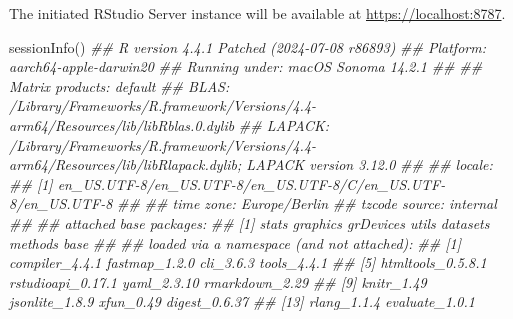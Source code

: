 \documentclass[
  letterpaper,
  DIV=11,
  numbers=noendperiod]{scrreprt}
\newenvironment{Shaded}{\begin{snugshade}}{\end{snugshade}}
\newcommand{\DocumentationTok}[1]{\textcolor[rgb]{0.37,0.37,0.37}{\textit{#1}}}
\newcommand{\FunctionTok}[1]{\textcolor[rgb]{0.28,0.35,0.67}{#1}}
\newcommand{\NormalTok}[1]{\textcolor[rgb]{0.00,0.23,0.31}{#1}}
\begin{document}
The initiated RStudio Server instance will be available at
\url{https://localhost:8787}.

\begin{tcolorbox}[enhanced jigsaw, toprule=.15mm, title=\textcolor{quarto-callout-note-color}{\faInfo}\hspace{0.5em}{Session info}, breakable, coltitle=black, colback=white, colframe=quarto-callout-note-color-frame, left=2mm, opacityback=0, colbacktitle=quarto-callout-note-color!10!white, opacitybacktitle=0.6, rightrule=.15mm, toptitle=1mm, arc=.35mm, bottomtitle=1mm, titlerule=0mm, bottomrule=.15mm, leftrule=.75mm]

\begin{Shaded}
\begin{Highlighting}[]
\FunctionTok{sessionInfo}\NormalTok{()}
\DocumentationTok{\#\#  R version 4.4.1 Patched (2024{-}07{-}08 r86893)}
\DocumentationTok{\#\#  Platform: aarch64{-}apple{-}darwin20}
\DocumentationTok{\#\#  Running under: macOS Sonoma 14.2.1}
\DocumentationTok{\#\#  }
\DocumentationTok{\#\#  Matrix products: default}
\DocumentationTok{\#\#  BLAS:   /Library/Frameworks/R.framework/Versions/4.4{-}arm64/Resources/lib/libRblas.0.dylib }
\DocumentationTok{\#\#  LAPACK: /Library/Frameworks/R.framework/Versions/4.4{-}arm64/Resources/lib/libRlapack.dylib;  LAPACK version 3.12.0}
\DocumentationTok{\#\#  }
\DocumentationTok{\#\#  locale:}
\DocumentationTok{\#\#  [1] en\_US.UTF{-}8/en\_US.UTF{-}8/en\_US.UTF{-}8/C/en\_US.UTF{-}8/en\_US.UTF{-}8}
\DocumentationTok{\#\#  }
\DocumentationTok{\#\#  time zone: Europe/Berlin}
\DocumentationTok{\#\#  tzcode source: internal}
\DocumentationTok{\#\#  }
\DocumentationTok{\#\#  attached base packages:}
\DocumentationTok{\#\#  [1] stats     graphics  grDevices utils     datasets  methods   base     }
\DocumentationTok{\#\#  }
\DocumentationTok{\#\#  loaded via a namespace (and not attached):}
\DocumentationTok{\#\#   [1] compiler\_4.4.1    fastmap\_1.2.0     cli\_3.6.3         tools\_4.4.1      }
\DocumentationTok{\#\#   [5] htmltools\_0.5.8.1 rstudioapi\_0.17.1 yaml\_2.3.10       rmarkdown\_2.29   }
\DocumentationTok{\#\#   [9] knitr\_1.49        jsonlite\_1.8.9    xfun\_0.49         digest\_0.6.37    }
\DocumentationTok{\#\#  [13] rlang\_1.1.4       evaluate\_1.0.1}
\end{Highlighting}
\end{Shaded}

\end{tcolorbox}

\end{document}
